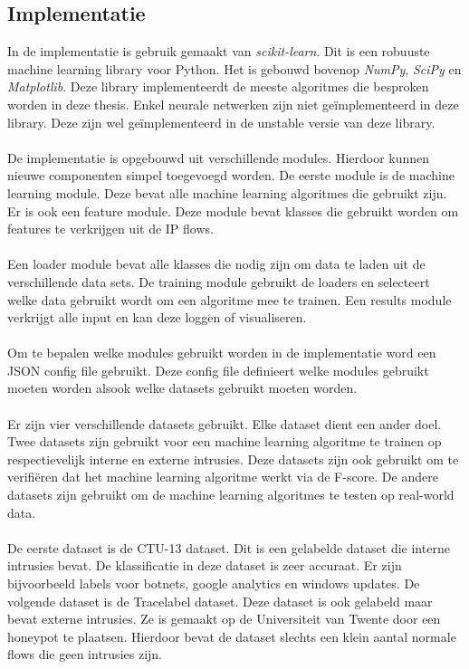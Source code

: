 \begin{samenvatting}
\section{Implementatie}
In de implementatie is gebruik gemaakt van \textit{scikit-learn}. Dit is een robuuste  machine learning library voor Python. Het is gebouwd bovenop \textit{NumPy}, \textit{SciPy} en \textit{Matplotlib}. Deze library implementeerdt de meeste algoritmes die besproken worden in deze thesis. Enkel neurale netwerken zijn niet ge\"implementeerd in deze library. Deze zijn wel ge\"implementeerd in de unstable versie van deze library.\\
\\
De implementatie is opgebouwd uit verschillende modules. Hierdoor kunnen nieuwe componenten simpel toegevoegd worden. De eerste module is de machine learning module. Deze bevat alle machine learning algoritmes die gebruikt zijn. Er is ook een feature module. Deze module bevat klasses die gebruikt worden om features te verkrijgen uit de IP flows. \\
\\
Een loader module bevat alle klasses die nodig zijn om data te laden uit de verschillende data sets. De training module gebruikt de loaders en selecteert welke data gebruikt wordt om een algoritme mee te trainen. Een results module verkrijgt alle input en kan deze loggen of visualiseren.\\
\\
Om te bepalen welke modules gebruikt worden in de implementatie word een JSON config file gebruikt. Deze config file definieert welke modules gebruikt moeten worden alsook welke datasets gebruikt moeten worden. \\
\\
Er zijn vier verschillende datasets gebruikt. Elke dataset dient een ander doel. Twee datasets zijn gebruikt voor een machine learning algoritme te trainen op respectievelijk interne en externe intrusies. Deze datasets zijn ook gebruikt om te verifi\"eren dat het machine learning algoritme werkt via de F-score. De andere datasets zijn gebruikt om de machine learning algoritmes te testen op real-world data. \\
\\
De eerste dataset is de CTU-13 dataset. Dit is een gelabelde dataset die interne intrusies bevat. De klassificatie in deze dataset is zeer accuraat. Er zijn bijvoorbeeld labels voor botnets, google analytics en windows updates. De volgende dataset is de Tracelabel dataset. Deze dataset is ook gelabeld maar bevat externe intrusies. Ze is gemaakt op de Universiteit van Twente door een honeypot te plaatsen. Hierdoor bevat de dataset slechts een klein aantal normale flows die geen intrusies zijn.\\

\end{samenvatting}
